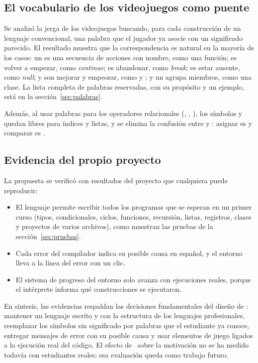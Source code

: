 \subsection{El vocabulario de los videojuegos como puente}

Se analizó la jerga de los videojuegos buscando, para cada construcción de un lenguaje convencional, una palabra que el jugador ya asocie con un significado parecido. El resultado muestra que la correspondencia es natural en la mayoría de los casos: un  es una secuencia de acciones con nombre, como una función;  es volver a empezar, como \emph{continue};  es abandonar, como \emph{break};  es estar ausente, como \emph{null};  y  son mejorar y empeorar, como \kw{++} y \kw{--}; y un  agrupa miembros, como una clase. La lista completa de palabras reservadas, con su propósito y un ejemplo, está en la sección~\ref{sec:palabras}.

Además, al usar palabras para los operadores relacionales (, , ), los símbolos \kw{<} y \kw{>} quedan libres para índices y listas, y se elimina la confusión entre \kw{=} y \kw{==}: asignar es  y comparar es .

\subsection{Evidencia del propio proyecto}

La propuesta se verificó con resultados del proyecto que cualquiera puede reproducir:

\begin{itemize}
  \item El lenguaje permite escribir todos los programas que se esperan en un primer curso (tipos, condicionales, ciclos, funciones, recursión, listas, registros, clases y proyectos de varios archivos), como muestran las pruebas de la sección~\ref{sec:pruebas}.
  \item Cada error del compilador indica su posible causa en español, y el entorno lleva a la línea del error con un clic.
  \item El sistema de progreso del entorno solo avanza con ejecuciones reales, porque el intérprete informa qué construcciones se ejecutaron.
\end{itemize}

En síntesis, las evidencias respaldan las decisiones fundamentales del diseño de \ggez: mantener un lenguaje escrito y con la estructura de los lenguajes profesionales, reemplazar los símbolos sin significado por palabras que el estudiante ya conoce, entregar mensajes de error con su posible causa y usar elementos de juego ligados a la ejecución real del código. El efecto de \ggez\ sobre la motivación no se ha medido todavía con estudiantes reales; esa evaluación queda como trabajo futuro.

